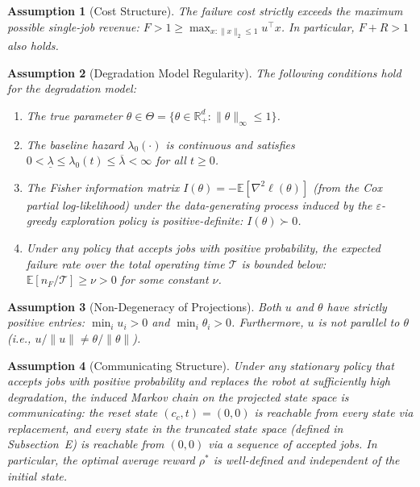 \documentclass[letterpaper, 10 pt, conference]{IEEEconf}
\newtheorem{assumption}{Assumption}
\newcommand{\E}{\mathbb{E}}
\begin{document}
\begin{assumption}[Cost Structure]
\label{ass:cost}
The failure cost strictly exceeds the maximum possible single-job revenue: $F > 1 \geq \max_{x: \|x\|_2 \leq 1} u^\top x$. In particular, $F + R > 1$ also holds.
\end{assumption}

\begin{assumption}[Degradation Model Regularity]
\label{ass:cox}
The following conditions hold for the degradation model:
\begin{enumerate}
    \item[(i)] The true parameter $\theta \in \Theta = \{\theta \in \mathbb{R}^d_+ : \|\theta\|_\infty \leq 1\}$.
    \item[(ii)] The baseline hazard $\lambda_0(\cdot)$ is continuous and satisfies $0 < \underline{\lambda} \leq \lambda_0(t) \leq \overline{\lambda} < \infty$ for all $t \geq 0$.
    \item[(iii)] The Fisher information matrix $I(\theta) = -\E[\nabla^2 \ell(\theta)]$ (from the Cox partial log-likelihood) under the data-generating process induced by the $\varepsilon$-greedy exploration policy is positive-definite: $I(\theta) \succ 0$.
    \item[(iv)] Under any policy that accepts jobs with positive probability, the expected failure rate over the total operating time $\mathcal{T}$ is bounded below: $\E[n_F / \mathcal{T}] \geq \nu > 0$ for some constant $\nu$.
\end{enumerate}
\end{assumption}

\begin{assumption}[Non-Degeneracy of Projections]
\label{ass:projection}
Both $u$ and $\theta$ have strictly positive entries: $\min_i u_i > 0$ and $\min_i \theta_i > 0$. Furthermore, $u$ is not parallel to $\theta$ (i.e., $u / \|u\| \neq \theta / \|\theta\|$).
\end{assumption}

\begin{assumption}[Communicating Structure]
\label{ass:communicating}
Under any stationary policy that accepts jobs with positive probability and replaces the robot at sufficiently high degradation, the induced Markov chain on the projected state space is communicating: the reset state $(c_c, t) = (0, 0)$ is reachable from every state via replacement, and every state in the truncated state space (defined in Subsection~E) is reachable from $(0, 0)$ via a sequence of accepted jobs. In particular, the optimal average reward $\rho^*$ is well-defined and independent of the initial state.
\end{assumption}
\end{document}
